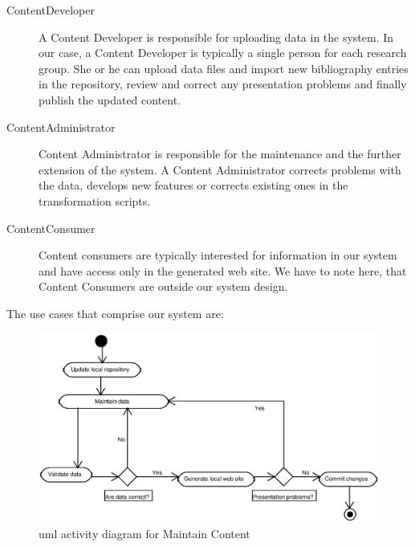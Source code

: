 \documentclass{elsart}
\begin{document}
\begin{description}
\item[ContentDeveloper] A Content Developer is responsible for uploading data in the system. 
In our case, a Content Developer is typically a single person for each research group. She or he can upload data files and 
import new bibliography entries in the repository, review and correct any presentation problems and finally publish the 
updated content.

\item[ContentAdministrator] Content Administrator is responsible for the maintenance 
and the further extension of the system. A Content Administrator corrects problems with the data, develops 
new features or corrects existing ones in the transformation scripts.

\item[ContentConsumer] Content consumers are typically interested for information in our system
and have access only in the generated web site. We have to note here, that Content Consumers are 
outside our system design.
\end{description}

The use cases that comprise our system are:

\begin{figure}
\includegraphics[scale=0.6]{maintain-content-activity}
\caption{{\sc uml} activity diagram for Maintain Content}
\label{fig:maintain-content-diagram}
\end{figure}
\end{document}
